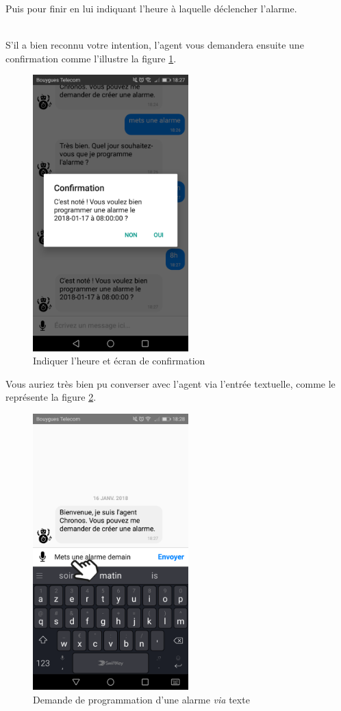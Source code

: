 Puis pour finir en lui indiquant l'heure à laquelle déclencher l'alarme. 

~\\\indent S'il a bien reconnu votre intention, l'agent vous demandera ensuite une confirmation comme l'illustre la figure \ref{E}.

\begin{figure}[H]
  \centering
  \includegraphics[width=6cm]{images/E.png}
  \caption{Indiquer l'heure et écran de confirmation}
  \label{E}
\end{figure}


Vous auriez très bien pu converser avec l'agent via l'entrée textuelle, comme le représente la figure \ref{F}.

\begin{figure}[H]
  \centering
  \includegraphics[width=6cm]{images/F.png}
  \caption{Demande de programmation d'une alarme \emph{via} texte}
  \label{F}
\end{figure}

